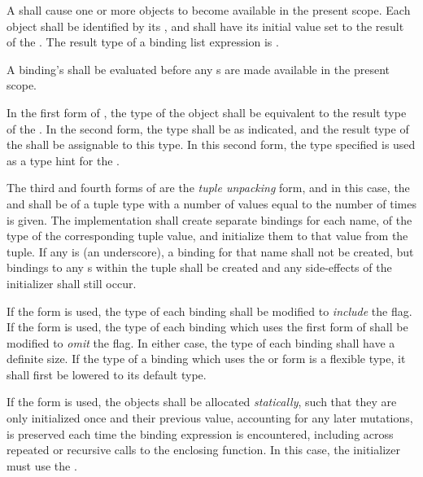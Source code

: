 \specsubsubitem
A  shall cause one or more objects to become
available in the present scope. Each object shall be identified by its
, and shall have its initial value set to the result of the
. The result type of a binding list expression is
.

\specsubsubitem
A binding's  shall be evaluated before any
s are made available in the present scope.


\specsubsubitem
In the first form of , the type of the object shall
be equivalent to the result type of the . In the
second form, the type shall be as indicated, and the result type of the
 shall be assignable to this type. In this second form,
the type specified is used as a type hint for the .

\specsubsubitem
The third and fourth forms of  are the \textit{tuple
unpacking} form, and in this case, the  and
 shall be of a tuple type with a number of values equal
to the number of times  is given. The implementation shall
create separate bindings for each name, of the type of the corresponding tuple
value, and initialize them to that value from the tuple. If any
 is \terminal{\_} (an underscore), a binding for that
name shall not be created, but bindings to any s within the tuple
shall be created and any side-effects of the initializer shall still occur.

\specsubsubitem
If the  form is used, the type of each binding shall be
modified to \textit{include} the  flag. If the 
form is used, the type of each binding which uses the first form of
 shall be modified to \textit{omit} the 
flag. In either case, the type of each binding shall have a definite size. If
the type of a binding which uses the  or  form is
a flexible type, it shall first be lowered to its default type.

\specsubsubitem
If the  form is used, the objects shall be allocated
\textit{statically}, such that they are only initialized once and their
previous value, accounting for any later mutations, is preserved each time
the binding expression is encountered, including across repeated or recursive
calls to the enclosing function. In this case, the initializer must use the
.

